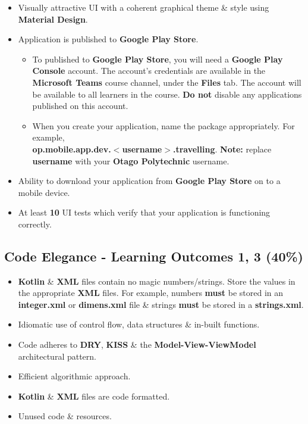 \documentclass{article}
\begin{document}
\begin{itemize}
	\item Visually attractive UI with a coherent graphical theme \& style using \textbf{Material Design}.
	\item Application is published to \textbf{Google Play Store}.
	      \begin{itemize}
	      	\item To published to \textbf{Google Play Store}, you will need a \textbf{Google Play Console} account. The account's credentials are available in the \textbf{Microsoft Teams} course channel, under the \textbf{Files} tab. The account will be available to all learners in the course. \textbf{Do not} disable any applications published on this account.
	      	\item When you create your application, name the package appropriately. For example, \\ \textbf{op.mobile.app.dev.$<$username$>$.travelling}. \textbf{Note:} replace \textbf{username} with your \textbf{Otago Polytechnic} username.
	      \end{itemize}
	\item Ability to download your application from \textbf{Google Play Store} on to a mobile device.
	\item At least \textbf{10} UI tests which verify that your application is functioning correctly.
\end{itemize}

\subsection*{Code Elegance - Learning Outcomes 1, 3 (40\%)}
\begin{itemize}
	\item \textbf{Kotlin} \& \textbf{XML} files contain no magic numbers/strings. Store the values in the appropriate \textbf{XML} files. For example, numbers \textbf{must} be stored in an \textbf{integer.xml} or \textbf{dimens.xml} file \& strings \textbf{must} be stored in a \textbf{strings.xml}.
	\item Idiomatic use of control flow, data structures \& in-built functions.
	\item Code adheres to \textbf{DRY}, \textbf{KISS} \& the \textbf{Model-View-ViewModel} architectural pattern.
	\item Efficient algorithmic approach.
	\item \textbf{Kotlin} \& \textbf{XML} files are code formatted.
	\item Unused code \& resources.
\end{itemize}
\end{document}
